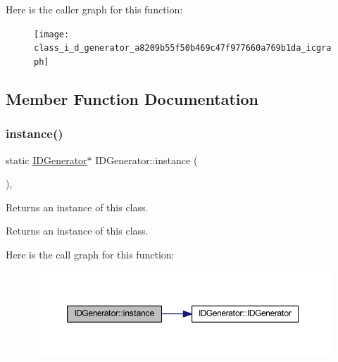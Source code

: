 Here is the caller graph for this function\+:\nopagebreak
\begin{figure}[H]
\begin{center}
\leavevmode
\texttt{[image: class\_i\_d\_generator\_a8209b55f50b469c47f977660a769b1da\_icgraph]}
\end{center}
\end{figure}


\subsection{Member Function Documentation}
\mbox{\label{class_i_d_generator_ad852c6dadc89e1020e4b3932f5a97bb3}} 
\subsubsection{\texorpdfstring{instance()}{instance()}}
{\footnotesize\ttfamily static \hyperlink{class_i_d_generator}{I\+D\+Generator}$\ast$ I\+D\+Generator\+::instance (\begin{DoxyParamCaption}{ }\end{DoxyParamCaption})\hspace{0.3cm}{\ttfamily [inline]}, {\ttfamily [static]}}

Returns an instance of this class. \begin{DoxyReturn}{Returns}
an instance of this class. 
\end{DoxyReturn}
Here is the call graph for this function\+:\nopagebreak
\begin{figure}[H]
\begin{center}
\leavevmode
\includegraphics[width=350pt]{class_i_d_generator_ad852c6dadc89e1020e4b3932f5a97bb3_cgraph}
\end{center}
\end{figure}
\mbox{\label{class_i_d_generator_a99d8cabb2ec6a17888a8ccbe9c85fee0}} 
